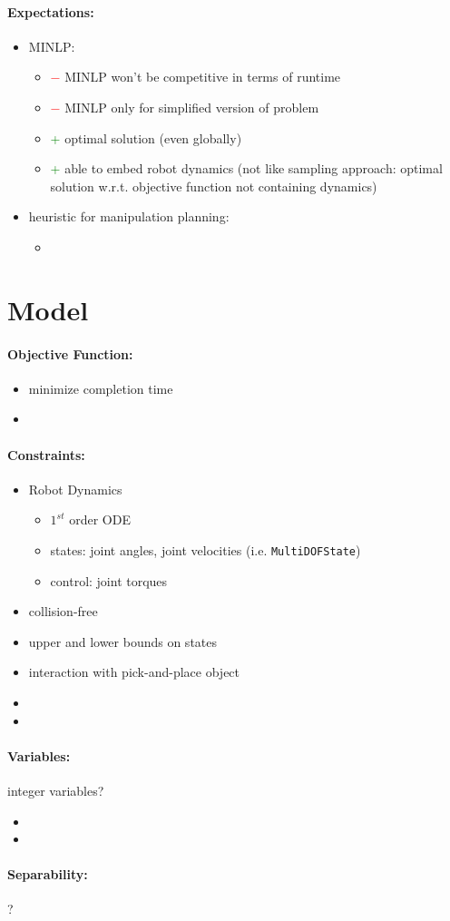\documentclass{article}
\begin{document}
\paragraph{Expectations:}
\begin{itemize}
\item MINLP:
	\begin{itemize}[label={}]
	\item \textcolor{red}{$-$} MINLP won't be competitive in terms of runtime
	\item \textcolor{red}{$-$} MINLP only for simplified version of problem
	\item \textcolor{green}{+} optimal solution (even globally)
	\item \textcolor{green}{+} able to embed robot dynamics (not like sampling approach: optimal solution w.r.t. objective function not containing dynamics)
	\end{itemize}
\item heuristic for manipulation planning:
	\begin{itemize}
	\item 
	\end{itemize}
\end{itemize}
\newpage
\section{Model}
\paragraph{Objective Function:}
\begin{itemize}
\item minimize completion time
\item 
\end{itemize}



\paragraph{Constraints:}
\begin{itemize}
\item Robot Dynamics
	\begin{itemize}
	\item $1^{st}$ order ODE
	\item states: joint angles, joint velocities (i.e. \texttt{MultiDOFState})
	\item control: joint torques
	\end{itemize}
\item collision-free
\item upper and lower bounds on states
\item interaction with pick-and-place object
\item 
\item 
\end{itemize}

\paragraph{Variables:} integer variables?
\begin{itemize}
\item 
\item 
\end{itemize}

\paragraph{Separability:} ?
\end{document}
